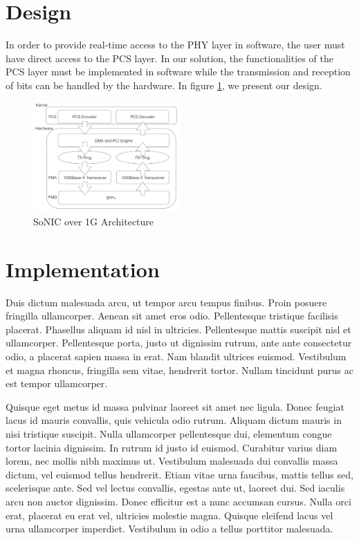 \documentclass[conference]{IEEEtran}
\begin{document}
\section{Design}

In order to provide real-time access to the PHY layer in software, the user must have direct access to the PCS layer. In our solution, the functionalities of the PCS layer must be implemented in software while the transmission and reception of bits can be handled by the hardware. In figure \ref{fig:design}, we present our design.

\begin{figure}[t]
  \centering
  \includegraphics[width=0.5\textwidth]{images/design.pdf}
  \caption{SoNIC over 1G Architecture}
  \label{fig:design}
\end{figure}

\section{Implementation}

Duis dictum malesuada arcu, ut tempor arcu tempus finibus. Proin posuere fringilla ullamcorper. Aenean sit amet eros odio. Pellentesque tristique facilisis placerat. Phasellus aliquam id nisl in ultricies. Pellentesque mattis suscipit nisl et ullamcorper. Pellentesque porta, justo ut dignissim rutrum, ante ante consectetur odio, a placerat sapien massa in erat. Nam blandit ultrices euismod. Vestibulum et magna rhoncus, fringilla sem vitae, hendrerit tortor. Nullam tincidunt purus ac est tempor ullamcorper.

Quisque eget metus id massa pulvinar laoreet sit amet nec ligula. Donec feugiat lacus id mauris convallis, quis vehicula odio rutrum. Aliquam dictum mauris in nisi tristique suscipit. Nulla ullamcorper pellentesque dui, elementum congue tortor lacinia dignissim. In rutrum id justo id euismod. Curabitur varius diam lorem, nec mollis nibh maximus ut. Vestibulum malesuada dui convallis massa dictum, vel euismod tellus hendrerit. Etiam vitae urna faucibus, mattis tellus sed, scelerisque ante. Sed vel lectus convallis, egestas ante ut, laoreet dui. Sed iaculis arcu non auctor dignissim. Donec efficitur est a nunc accumsan cursus. Nulla orci erat, placerat eu erat vel, ultricies molestie magna. Quisque eleifend lacus vel urna ullamcorper imperdiet. Vestibulum in odio a tellus porttitor malesuada.
\end{document}
